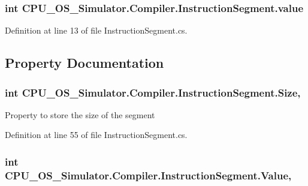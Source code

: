 \subsubsection[{value}]{\setlength{\rightskip}{0pt plus 5cm}int C\+P\+U\+\_\+\+O\+S\+\_\+\+Simulator.\+Compiler.\+Instruction\+Segment.\+value\hspace{0.3cm}{\ttfamily [private]}}\label{class_c_p_u___o_s___simulator_1_1_compiler_1_1_instruction_segment_acdf33d1614b2f7c9125f97793d0b6f8b}


Definition at line 13 of file Instruction\+Segment.\+cs.



\subsection{Property Documentation}
\hypertarget{class_c_p_u___o_s___simulator_1_1_compiler_1_1_instruction_segment_a6bdea24d923f03277868b53412a6a424}{}
\subsubsection[{Size}]{\setlength{\rightskip}{0pt plus 5cm}int C\+P\+U\+\_\+\+O\+S\+\_\+\+Simulator.\+Compiler.\+Instruction\+Segment.\+Size\hspace{0.3cm}{\ttfamily [get]}, {\ttfamily [set]}}\label{class_c_p_u___o_s___simulator_1_1_compiler_1_1_instruction_segment_a6bdea24d923f03277868b53412a6a424}


Property to store the size of the segment 



Definition at line 55 of file Instruction\+Segment.\+cs.

\hypertarget{class_c_p_u___o_s___simulator_1_1_compiler_1_1_instruction_segment_a1e8c5f60cda7233d75e61d44cc43b6b8}{}
\subsubsection[{Value}]{\setlength{\rightskip}{0pt plus 5cm}int C\+P\+U\+\_\+\+O\+S\+\_\+\+Simulator.\+Compiler.\+Instruction\+Segment.\+Value\hspace{0.3cm}{\ttfamily [get]}, {\ttfamily [set]}}\label{class_c_p_u___o_s___simulator_1_1_compiler_1_1_instruction_segment_a1e8c5f60cda7233d75e61d44cc43b6b8}


